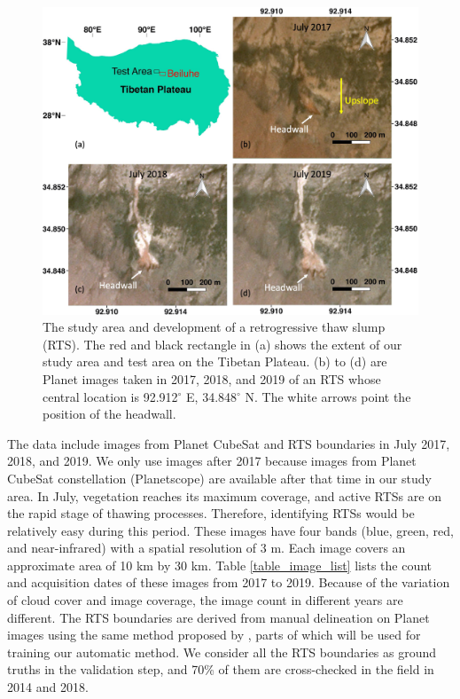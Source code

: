 \documentclass[authoryear,preprint,review,12pt]{elsarticle}
\begin{document}
\begin{figure} 
	\centering
	\includegraphics[width=14cm]{figs/rts_multi_images_study_area_v2_trim.jpg}
	\caption{The study area and development of a retrogressive thaw slump (RTS). The red and black rectangle in (a) shows the extent of our study area and test area on the Tibetan Plateau. (b) to (d) are Planet images taken in 2017, 2018, and 2019 of an RTS whose central location is 92.912$^\circ$ E, 34.848$^\circ$ N. The white arrows point the position of the headwall. } %
	\label{fig_multi_rts_image_studyarea}
\end{figure}


The data include images from Planet CubeSat and RTS boundaries in July 2017, 2018, and 2019.
We only use images after 2017 because images from Planet CubeSat constellation (Planetscope) are available after that time in our study area.  
In July, vegetation reaches its maximum coverage, and active RTSs are on the rapid stage of thawing processes. 
Therefore, identifying RTSs would be relatively easy during this period.
These images have four bands (blue, green, red, and near-infrared) with a spatial resolution of 3 m. 
Each image covers an approximate area of 10 km by 30 km.
Table \ref{table_image_list} lists the count and acquisition dates of these images from 2017 to 2019. 
Because of the variation of cloud cover and image coverage, the image count in different years are different.
The RTS boundaries are derived from manual delineation on Planet images using the same method proposed by \cite{huang2020using}, parts of which will be used for training our automatic method. 
We consider all the RTS boundaries as ground truths in the validation step, and 70\% of them are cross-checked in the field in 2014 and 2018. %
\end{document}

